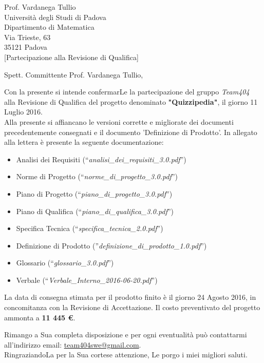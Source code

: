 \documentclass[boldsubject,shortindent,a4paper,11pt]{letteracdp}
\date{4 Luglio 2016}
\begin{document}
\begin{letter}{	Prof. Vardanega Tullio \\
				Universit\`a degli Studi di Padova \\
				Dipartimento di Matematica \\
				Via Trieste, 63 \\
				35121 Padova\\
				}
[Partecipazione alla Revisione di Qualifica]
\opening{Spett. Committente Prof. Vardanega Tullio,}
\noindent
Con la presente si intende confermarLe la partecipazione del gruppo \emph{Team404} alla Revisione di Qualifica del progetto denominato \textbf{"Quizzipedia"}, il giorno 11 Luglio 2016.
\\
\noindent
Alla presente si affiancano le versioni corrette e migliorate dei documenti precedentemente consegnati e il documento 'Definizione di Prodotto'.
\newline
\noindent
In allegato alla lettera è presente la seguente documentazione:
\begin{itemize}
	\item Analisi dei Requisiti (``\textit{analisi\_dei\_requisiti\_3.0.pdf}'')
	\item Norme di Progetto (``\textit{norme\_di\_progetto\_3.0.pdf}'')
	\item Piano di Progetto (``\textit{piano\_di\_progetto\_3.0.pdf}'')
	\item Piano di Qualifica (``\textit{piano\_di\_qualifica\_3.0.pdf}'')
	\item Specifica Tecnica (``\textit{specifica\_tecnica\_2.0.pdf}'')
	\item Definizione di Prodotto (''\textit{definizione\_di\_prodotto\_1.0.pdf}'')
	\item Glossario (``\textit{glossario\_3.0.pdf}'')
	\item Verbale (``\textit{Verbale\_Interno\_2016-06-20.pdf}'')
\end{itemize}

\noindent

La data di consegna stimata per il prodotto finito è il giorno 24 Agosto 2016, in concomitanza con la Revisione di Accettazione. 
Il costo preventivato del progetto ammonta a \textbf{11 445 \euro}.

\closing{Rimango a Sua completa disposizione e per ogni eventualit\`a pu\`o contattarmi all'indirizzo email: \url{team404swe@gmail.com}.\\RingraziandoLa per la Sua cortese attenzione, Le porgo i miei migliori saluti.}
\end{letter}
\end{document}
